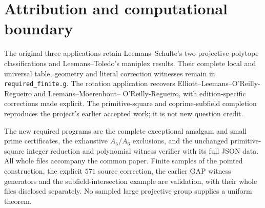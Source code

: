 \documentclass[11pt,a4paper]{article}
\begin{document}
\section{Attribution and computational boundary}
The original three applications retain Leemans--Schulte's two projective
polytope classifications and Leemans--Toledo's maniplex results. Their
complete local and universal table, geometry and literal correction
witnesses remain in \texttt{required\_finite.g}. The rotation application
recovers Elliott--Leemans--O'Reilly-Regueiro and Leemans--Moerenhout--
O'Reilly-Regueiro, with edition-specific corrections made explicit.
The primitive-square and coprime-subfield completion reproduces the
project's earlier accepted work; it is not new question credit.

The new required programs are the complete exceptional amalgam and small
prime certificates, the exhaustive $A_5/A_6$ exclusions, and the unchanged
primitive-square integer reduction and polynomial witness verifier with
its full JSON data. All whole files accompany the common paper. Finite
samples of the pointed construction, the explicit $571$ source correction,
the earlier GAP witness generators and the subfield-intersection example
are validation, with their whole files disclosed separately. No sampled
large projective group supplies a uniform theorem.
\end{document}
